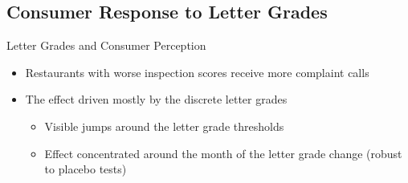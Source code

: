 \documentclass[handout]{beamer}
\begin{document}

\subsection{Consumer Response to Letter Grades}

\begin{frame}{Letter Grades and Consumer Perception }
\begin{itemize}
\item Restaurants with worse inspection scores receive more complaint calls
\item The effect driven mostly by the discrete letter grades
\begin{itemize}
\item Visible jumps around the letter grade thresholds
\item Effect concentrated around the month of the letter grade change (robust to placebo tests)
\end{itemize}
\end{itemize}
\end{frame}
\end{document}

